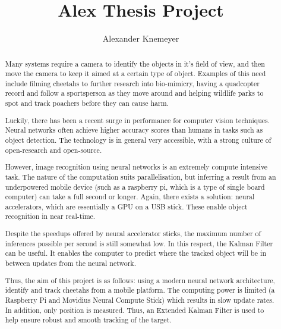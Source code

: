 \documentclass{article}
\begin{document}
\title{Alex Thesis Project}
\author{Alexander Knemeyer}

\maketitle


\newpage


\begin{abstract}
Many systems require a camera to identify the objects in it's field of view, and then move the camera to keep it aimed at a certain type of object. Examples of this need include filming cheetahs to further research into bio-mimicry, having a quadcopter record and follow a sportsperson as they move around and helping wildlife parks to spot and track poachers before they can cause harm.

Luckily, there has been a recent surge in performance for computer vision techniques. Neural networks often achieve higher accuracy scores than humans in tasks such as object detection. The technology is in general very accessible, with a strong culture of open-research and open-source.

However, image recognition using neural networks is an extremely compute intensive task. The nature of the computation suits parallelisation, but inferring a result from an underpowered mobile device (such as a raspberry pi, which is a type of single board computer) can take a full second or longer. Again, there exists a solution: neural accelerators, which are essentially a GPU on a USB stick. These enable object recognition in near real-time.

Despite the speedups offered by neural accelerator sticks, the maximum number of inferences possible per second is still somewhat low. In this respect, the Kalman Filter can be useful. It enables the computer to predict where the tracked object will be in between updates from the neural network.

Thus, the aim of this project is as follows: using a modern neural network architecture, identify and track cheetahs from a mobile platform. The computing power is limited (a Raspberry Pi and Movidius Neural Compute Stick) which results in slow update rates. In addition, only position is measured. Thus, an Extended Kalman Filter is used to help ensure robust and smooth tracking of the target.
\end{abstract}
\end{document}
